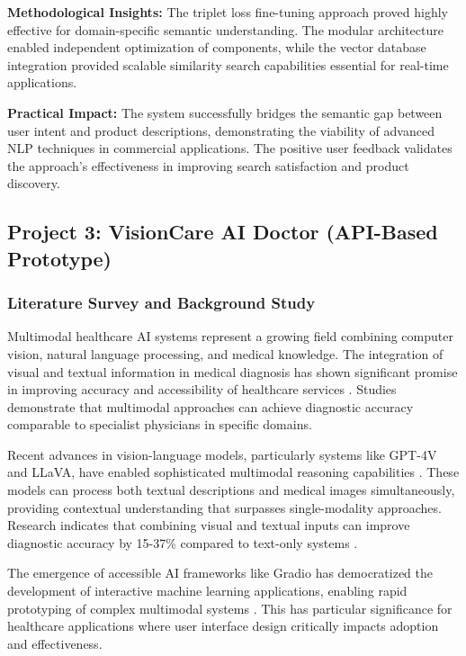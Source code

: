 \documentclass[12pt,a4paper]{article}
\begin{document}
\textbf{Methodological Insights:}
The triplet loss fine-tuning approach proved highly effective for domain-specific semantic understanding. The modular architecture enabled independent optimization of components, while the vector database integration provided scalable similarity search capabilities essential for real-time applications.

\textbf{Practical Impact:}
The system successfully bridges the semantic gap between user intent and product descriptions, demonstrating the viability of advanced NLP techniques in commercial applications. The positive user feedback validates the approach's effectiveness in improving search satisfaction and product discovery.

\subsection{Project 3: VisionCare AI Doctor (API-Based Prototype)}

\subsubsection{Literature Survey and Background Study}
Multimodal healthcare AI systems represent a growing field combining computer vision, natural language processing, and medical knowledge. The integration of visual and textual information in medical diagnosis has shown significant promise in improving accuracy and accessibility of healthcare services \citep{esteva2019guide}. Studies demonstrate that multimodal approaches can achieve diagnostic accuracy comparable to specialist physicians in specific domains.

Recent advances in vision-language models, particularly systems like GPT-4V and LLaVA, have enabled sophisticated multimodal reasoning capabilities \citep{liu2024visual}. These models can process both textual descriptions and medical images simultaneously, providing contextual understanding that surpasses single-modality approaches. Research indicates that combining visual and textual inputs can improve diagnostic accuracy by 15-37\% compared to text-only systems \citep{chen2020multimodal}.

The emergence of accessible AI frameworks like Gradio has democratized the development of interactive machine learning applications, enabling rapid prototyping of complex multimodal systems \citep{abid2019gradio}. This has particular significance for healthcare applications where user interface design critically impacts adoption and effectiveness.
\end{document}
